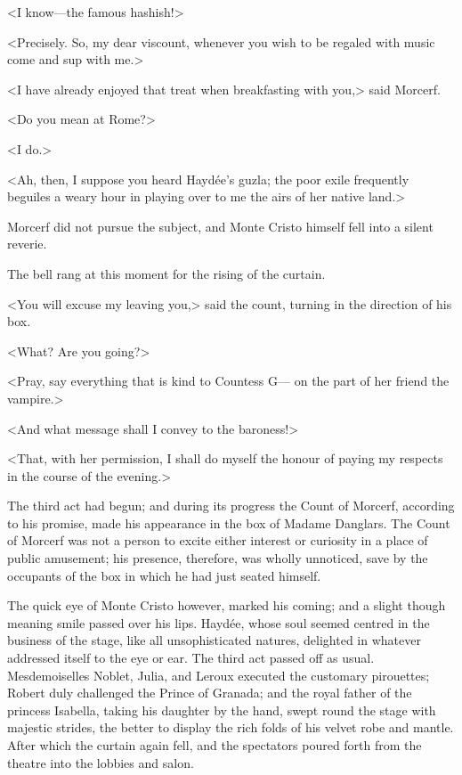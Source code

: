  <I know—the famous hashish!> 

 <Precisely. So, my dear viscount, whenever you wish to be regaled with music come and sup with me.> 

 <I have already enjoyed that treat when breakfasting with you,> said Morcerf. 

 <Do you mean at Rome?> 

 <I do.> 

 <Ah, then, I suppose you heard Haydée's guzla; the poor exile frequently beguiles a weary hour in playing over to me the airs of her native land.> 

 Morcerf did not pursue the subject, and Monte Cristo himself fell into a silent reverie. 

 The bell rang at this moment for the rising of the curtain. 

 <You will excuse my leaving you,> said the count, turning in the direction of his box. 

 <What? Are you going?> 

 <Pray, say everything that is kind to Countess G— on the part of her friend the vampire.> 

 <And what message shall I convey to the baroness!> 

 <That, with her permission, I shall do myself the honour of paying my respects in the course of the evening.> 

 The third act had begun; and during its progress the Count of Morcerf, according to his promise, made his appearance in the box of Madame Danglars. The Count of Morcerf was not a person to excite either interest or curiosity in a place of public amusement; his presence, therefore, was wholly unnoticed, save by the occupants of the box in which he had just seated himself. 

 The quick eye of Monte Cristo however, marked his coming; and a slight though meaning smile passed over his lips. Haydée, whose soul seemed centred in the business of the stage, like all unsophisticated natures, delighted in whatever addressed itself to the eye or ear.  The third act passed off as usual. Mesdemoiselles Noblet, Julia, and Leroux executed the customary pirouettes; Robert duly challenged the Prince of Granada; and the royal father of the princess Isabella, taking his daughter by the hand, swept round the stage with majestic strides, the better to display the rich folds of his velvet robe and mantle. After which the curtain again fell, and the spectators poured forth from the theatre into the lobbies and salon. 

